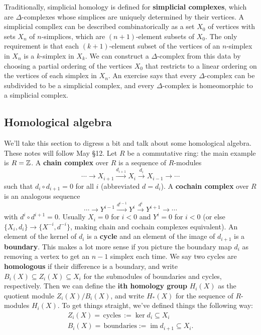 Traditionally, simplicial homology is defined for \textbf{simplicial complexes}, which are $\Delta$-complexes whose simplices are uniquely determined by their vertices. A simplicial compllex can be described combinatorically as a set $X_0$ of vertices with sets $X_n $ of $n$-simplices, which are $(n+1)$-element subsets of $X_0$. The only requirement is that each $(k+1)$-element subset of the vertices of an $n$-simplex in $X_n $ is a $k$-simplex in $X_k$. We can construct a $\Delta$-complex from this data by choosing a partial ordering of the vertices $X_0$ that restricts to a linear ordering on the vertices of each simplex in $X_n $. An exercise says that every $\Delta$-complex can be subdivided to be a simplicial complex, and every $\Delta$-complex is homeomorphic to a simplicial complex.

\subsection{Homological algebra}
We'll take this section to digress a bit and talk about some homological algebra. These notes will follow May \S 12.
\orbreak
Let $R$ be a commutative ring: the main example is $R=\mathbb{Z}$. A \textbf{chain complex} over $R$ is a sequence of $R$-modules \[
    \cdots \to X_{i+1}\overset{d_{i+1}}{\longrightarrow}X_i \overset{d_i }{\longrightarrow}X_{i-1}\to \cdots 
\] such that $d_i \circ d_{i+1}=0$ for all $i$ (abbreviated $d=d_i $). A \textbf{cochain complex} over $R$ is an analogous sequence \[
\cdots \to Y^{i-1}\overset{d^{i-1}}{\longrightarrow}Y^i \overset{d^i }{\longrightarrow}Y^{i+1}\to \cdots 
\] with $d^i \circ d^{i+1}=0$. Usually $X_i =0$ for $i<0$ and $Y^i =0$ for $i<0$ (or else $\{X_i ,d_i \} \to \{X^{-i},d^{-i}\} $, making chain and cochain complexes equivalent). An element of the kernel of $d_i $ is a \textbf{cycle} and an element of the image of $d_{i+1}$ is a \textbf{boundary}. This makes a lot more sense if you picture the boundary map $d_i $ as removing a vertex to get an $n-1$ simplex each time. We say two cycles are \textbf{homologous} if their difference is a boundary, and write $B_i (X) \subseteq Z_i  (X) \subseteq X_i $ for the submodules of boundaries and cycles, respectively. Then we can define the $\mathbf{i}$\textbf{th homology group} $H_i (X)$ as the quotient module $Z_i (X) /B_i (X)$, and write $H_*(X)$ for the sequence of $R $-modules $H_i (X)$.
To get things straight, we've defined things the following way:
\begin{gather*}
    Z_i (X)= \, \text{cycles} \, := \ker d_i \subseteq X_i  \\
    B_i (X)= \, \text{boundaries} := \operatorname{im}d_{i+1} \subseteq X_i .
\end{gather*}
